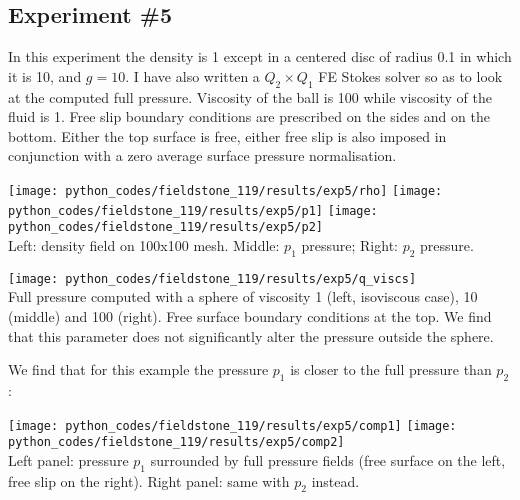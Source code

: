 \newpage
\subsection*{Experiment \#5}

In this experiment the density is 1 except in a centered disc of radius 0.1 in which it is 10, 
and $g=10$. 
I have also written a $Q_2\times Q_1$ FE Stokes solver so as to look at the computed 
full pressure. Viscosity of the ball is 100 while viscosity of the fluid is 1. 
Free slip boundary conditions are prescribed on the sides and on the bottom. 
Either the top surface is free, either free slip is also imposed in 
conjunction with a zero average surface pressure normalisation.

\begin{center}
\texttt{[image: python\_codes/fieldstone\_119/results/exp5/rho]}
\texttt{[image: python\_codes/fieldstone\_119/results/exp5/p1]}
\texttt{[image: python\_codes/fieldstone\_119/results/exp5/p2]}\\
{\captionfont Left: density field on 100x100 mesh. Middle: $p_1$ pressure; Right: $p_2$ pressure.} 
\end{center}

\begin{center}
\texttt{[image: python\_codes/fieldstone\_119/results/exp5/q\_viscs]}\\
{\captionfont Full pressure computed with a sphere of viscosity 1 (left, isoviscous case), 
10 (middle) and 100 (right). Free surface boundary conditions at the top. 
We find that this parameter does not significantly alter the pressure outside the sphere.}
\end{center}


We find that for this example the pressure $p_1$ is closer to the full pressure than $p_2$:
\begin{center}
\texttt{[image: python\_codes/fieldstone\_119/results/exp5/comp1]}
\hspace{0.5cm}
\texttt{[image: python\_codes/fieldstone\_119/results/exp5/comp2]}\\
{\captionfont Left panel: pressure $p_1$ surrounded by full pressure fields (free surface
on the left, free slip on the right). Right panel: same with $p_2$ instead.}
\end{center}

